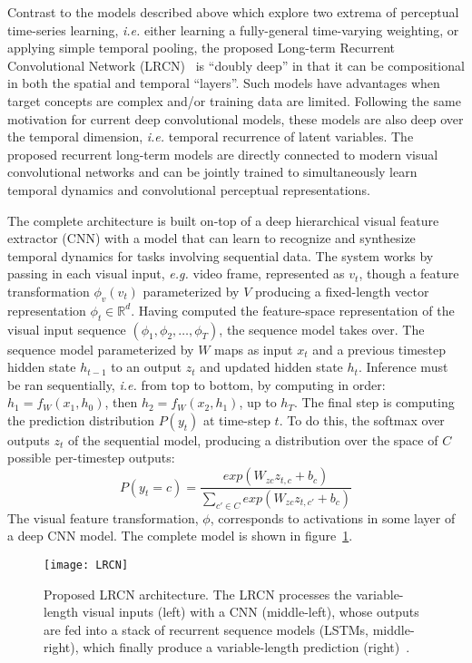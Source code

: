 Contrast to the models described above which explore two extrema of perceptual time-series learning, \textit{i.e.} either learning a fully-general time-varying weighting, or applying simple temporal pooling, the proposed Long-term Recurrent Convolutional Network (LRCN)~\cite{LRCN:2015} is ``doubly deep'' in that it can be compositional in both the spatial and temporal ``layers''. Such models have advantages when target concepts are complex and/or training data are limited. Following the same motivation for current deep convolutional models, these models are also deep over the temporal dimension, \textit{i.e.} temporal recurrence of latent variables. The proposed recurrent long-term models are directly connected to modern visual convolutional networks and can be jointly trained to simultaneously learn temporal dynamics and convolutional perceptual representations.


The complete architecture is built on-top of a deep hierarchical visual feature extractor (CNN) with a model that can learn to recognize and synthesize temporal dynamics for tasks involving sequential data. The system works by passing in each visual input, \textit{e.g.} video frame, represented as $v_t$, though a feature transformation $\phi_v(v_t)$ parameterized by $V$ producing a fixed-length vector representation $\phi_t \in \mathbb{R}^d$. Having computed the feature-space representation of the visual input sequence $(\phi_1, \phi_2, \dots, \phi_T)$, the sequence model takes over. The sequence model parameterized by $W$ maps as input $x_t$ and a previous timestep hidden state $h_{t-1}$ to an output $z_t$ and updated hidden state $h_t$. Inference must be ran sequentially, \textit{i.e.} from top to bottom, by computing in order: $h_1 = f_W(x_1, h_0)$, then $h_2 = f_W(x_2, h_1)$, up to $h_T$. The final step is computing the prediction distribution $P(y_t)$ at time-step $t$. To do this, the softmax over outputs $z_t$ of the sequential model, producing a distribution over the space of $C$ possible per-timestep outputs:
\begin{equation}
  P(y_t=c) = \frac{exp(W_{zc}z_{t,c} + b_c)}{\sum_{c' \in C}{exp(W_{zc}z_{t,c'} + b_c)}}
\end{equation}
The visual feature transformation, $\phi$, corresponds to activations in some layer of a deep CNN model. The complete model is shown in figure~\ref{fig:lrcn}.

\begin{figure}
  \centering
    \texttt{[image: LRCN]}
    \caption{Proposed LRCN architecture. The LRCN processes the variable-length visual inputs (left) with a CNN (middle-left), whose outputs are fed into a stack of recurrent sequence models (LSTMs, middle-right), which finally produce a variable-length prediction (right)~\cite{LRCN:2015}.}
    \label{fig:lrcn}
\end{figure}

